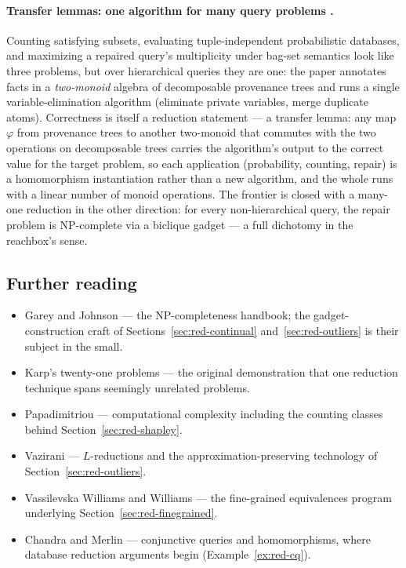 \paragraph{Transfer lemmas: one algorithm for many query problems \citep{sigmod26-264}.}
Counting satisfying subsets, evaluating tuple-independent probabilistic databases, and
maximizing a repaired query's multiplicity under bag-set semantics look like three
problems, but over hierarchical queries they are one: the paper annotates facts in a
\emph{two-monoid} algebra of decomposable provenance trees and runs a single
variable-elimination algorithm (eliminate private variables, merge duplicate atoms).
Correctness is itself a reduction statement --- a transfer lemma: any map $\varphi$
from provenance trees to another two-monoid that commutes with the two operations on
decomposable trees carries the algorithm's output to the correct value for the target
problem, so each application (probability, counting, repair) is a homomorphism
instantiation rather than a new algorithm, and the whole runs with a linear number of
monoid operations. The frontier is closed with a many-one reduction in the other
direction: for every non-hierarchical query, the repair problem is NP-complete via a
biclique gadget --- a full dichotomy in the reachbox's sense.

\subsection{Further reading}

\begin{itemize}
\item Garey and Johnson \citep{reduction-bg1} --- the NP-completeness handbook; the
  gadget-construction craft of Sections~\ref{sec:red-continual}
  and~\ref{sec:red-outliers} is their subject in the small.
\item Karp's twenty-one problems \citep{reduction-bg2} --- the original demonstration
  that one reduction technique spans seemingly unrelated problems.
\item Papadimitriou \citep{reduction-bg3} --- computational complexity including the
  counting classes behind Section~\ref{sec:red-shapley}.
\item Vazirani \citep{reduction-bg4} --- $L$-reductions and the approximation-preserving
  technology of Section~\ref{sec:red-outliers}.
\item Vassilevska Williams and Williams \citep{reduction-bg5} --- the fine-grained
  equivalences program underlying Section~\ref{sec:red-finegrained}.
\item Chandra and Merlin \citep{reduction-bg6} --- conjunctive queries and
  homomorphisms, where database reduction arguments begin
  (Example~\ref{ex:red-cq}).
\end{itemize}

